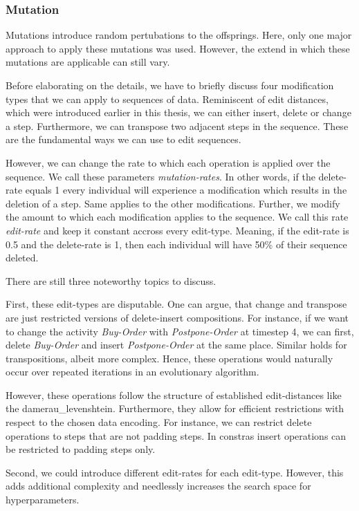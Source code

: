 \documentclass[./../../paper.tex]{subfiles}
\begin{document}
\subsubsection{Mutation}
Mutations introduce random pertubations to the offsprings. Here, only one major approach to apply these mutations was used. However, the extend in which these mutations are applicable can still vary.

Before elaborating on the details, we have to briefly discuss four modification types that we can apply to sequences of data. Reminiscent of edit distances, which were introduced earlier in this thesis, we can either insert, delete or change a step. Furthermore, we can transpose two adjacent steps in the sequence. These are the fundamental ways we can use to edit sequences.

However, we can change the rate to which each operation is applied over the sequence. We call these parameters \emph{mutation-rates}. In other words, if the delete-rate equals 1 every individual will experience a modification which results in the deletion of a step. Same applies to the other modifications. Further, we modify the amount to which each modification applies to the sequence. We call this rate \emph{edit-rate} and keep it constant accross every edit-type. Meaning, if the edit-rate is 0.5 and the delete-rate is 1, then each individual will have 50\% of their sequence deleted.

There are still three noteworthy topics to discuss.

First, these edit-types are disputable. One can argue, that change and transpose are just restricted versions of delete-insert compositions. For instance, if we want to change the activity \emph{Buy-Order} with \emph{Postpone-Order} at timestep 4, we can first, delete \emph{Buy-Order} and insert \emph{Postpone-Order} at the same place. Similar holds for transpositions, albeit more complex. Hence, these operations would naturally occur over repeated iterations in an evolutionary algorithm.

However, these operations follow the structure of established edit-distances like the \gls{damerau_levenshtein}. Furthermore, they allow for efficient restrictions with respect to the chosen data encoding. For instance, we can restrict delete operations to steps that are not padding steps. In constras insert operations can be restricted to padding steps only.

Second, we could introduce different edit-rates for each edit-type. However, this adds additional complexity and needlessly increases the search space for hyperparameters.
\end{document}
